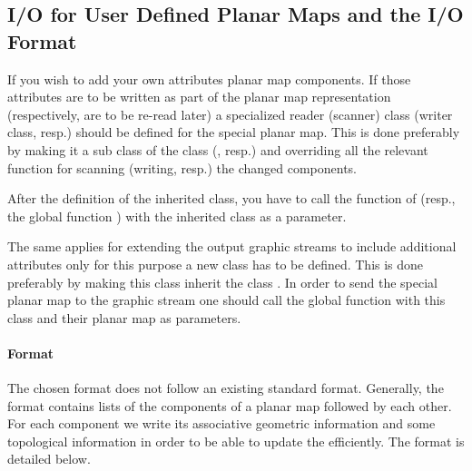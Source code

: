 \begin{ccAdvanced}
\subsection{I/O for User Defined Planar Maps and the I/O Format}

If you wish to add your own attributes planar map components. If
those attributes are to be written as part of the planar map
representation (respectively, are to be re-read later) a specialized
reader (scanner) class (writer class, resp.) should be defined for the
special planar map. This is done preferably by making it a sub class
of the class  (,
resp.) and overriding all the relevant function for scanning (writing,
resp.) the changed components.

After the definition of the inherited class, you have to call the
function  of  (resp., the global
function  ) with the inherited class as a
parameter. 

The same applies for extending the output graphic streams to include
additional attributes only for this purpose a new \/ class
has to be defined.  This is done preferably by making this class
inherit the class . In order to send the special
planar map to the graphic stream one should call the global function
 with this class and their planar map as parameters.

\paragraph{Format}
The chosen format does not follow an existing standard format.
Generally, the format contains lists of the components of a planar map 
followed by each other. For each component we write its associative
geometric information and some topological information in order to be
able to update the  efficiently. The format is detailed
below.

\begin{enumerate}


\end{enumerate}
\end{ccAdvanced}
